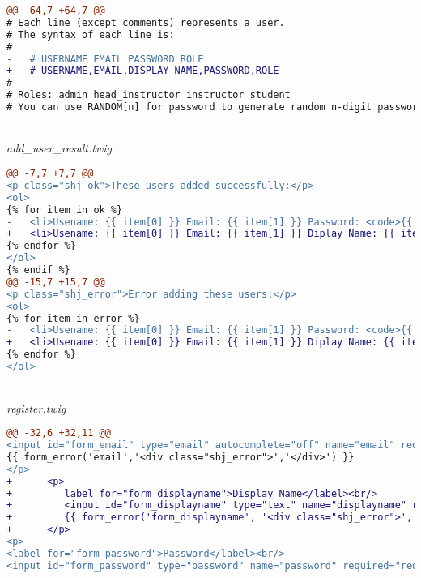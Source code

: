 \begin{lstlisting}[language=diff, basicstyle=\ttfamily, frame=single,
columns=fullflexible, keepspaces=true, breaklines=true]
@@ -64,7 +64,7 @@
# Each line (except comments) represents a user.
# The syntax of each line is:
#
-   # USERNAME EMAIL PASSWORD ROLE
+   # USERNAME,EMAIL,DISPLAY-NAME,PASSWORD,ROLE
#
# Roles: admin head_instructor instructor student
# You can use RANDOM[n] for password to generate random n-digit password.
\end{lstlisting}
~\\
\textit{add\_user\_result.twig}
\begin{lstlisting}[language=diff, basicstyle=\ttfamily, frame=single,
columns=fullflexible, keepspaces=true, breaklines=true]
@@ -7,7 +7,7 @@
<p class="shj_ok">These users added successfully:</p>
<ol>
{% for item in ok %}
-   <li>Usename: {{ item[0] }} Email: {{ item[1] }} Password: <code>{{ item[2] }}</code> Role: {{ item[3] }}</li>
+   <li>Usename: {{ item[0] }} Email: {{ item[1] }} Diplay Name: {{ item[2] }} Password: <code>{{ item[3] }}</code> Role: {{ item[4] }} </li>
{% endfor %}
</ol>
{% endif %}
@@ -15,7 +15,7 @@
<p class="shj_error">Error adding these users:</p>
<ol>
{% for item in error %}
-   <li>Usename: {{ item[0] }} Email: {{ item[1] }} Password: <code>{{ item[2] }}</code> Role: {{ item[3] }} ({{ item[4] }})</li>
+   <li>Usename: {{ item[0] }} Email: {{ item[1] }} Diplay Name: {{ item[2] }} Password: <code>{{ item[3] }}</code> Role: {{ item[4] }} ({{ item[5] }})</li>
{% endfor %}
</ol>
\end{lstlisting}
~\\
\textit{register.twig}
\begin{lstlisting}[language=diff, basicstyle=\ttfamily, frame=single,
columns=fullflexible, keepspaces=true, breaklines=true]
@@ -32,6 +32,11 @@
<input id="form_email" type="email" autocomplete="off" name="email" required="required" class="sharif_input" value="{{ set_value('email') }}"/>
{{ form_error('email','<div class="shj_error">','</div>') }}
</p>
+      <p>
+         label for="form_displayname">Display Name</label><br/>
+         <input id="form_displayname" type="text" name="displayname" required="required" pattern="[A-Za-z\s]+" title="The Display Name field must be contain only alphabetical letters" class="sharif_input" value="{{ set_value('displayname') }}"/>
+         {{ form_error('form_displayname', '<div class="shj_error">', '</div>') }}
+      </p>
<p>
<label for="form_password">Password</label><br/>
<input id="form_password" type="password" name="password" required="required" pattern=".{6,200}" title="The Password field must be at least 6 characters in length" class="sharif_input"/>
\end{lstlisting}

